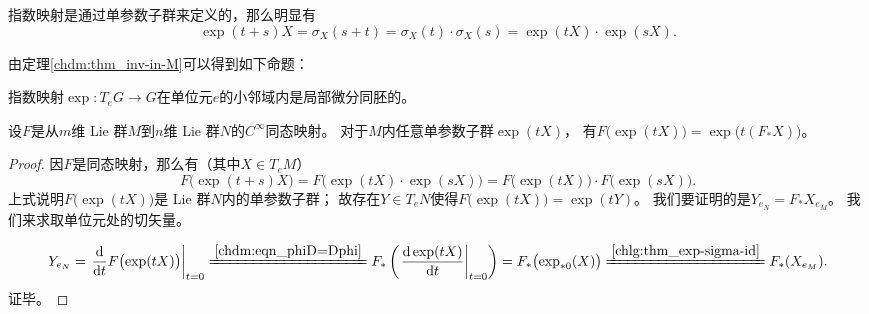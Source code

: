指数映射是通过单参数子群来定义的，那么明显有
\begin{equation}
    \exp(t+s)X = \sigma_X(s+t) = \sigma_X(t)\cdot \sigma_X(s) = \exp(tX) \cdot \exp(sX) .
\end{equation}

由定理\ref{chdm:thm_inv-in-M}可以得到如下命题：
\begin{proposition}\label{chlg:thm_exp-sigma-id-cor1}
    指数映射$\exp : T_e G \to G$在单位元$e$的小邻域内是局部微分同胚的。
\end{proposition}

\begin{theorem}\label{chlg:thm_feef}
    设$F$是从$m$维 Lie 群$M$到$n$维 Lie 群$N$的$C^\infty$同态映射。
    对于$M$内任意单参数子群$\exp (tX)$，
    有$F\bigl(\exp (tX)\bigr) = \exp \bigl(t (F_{*} X)\bigr)$。
\end{theorem}
\begin{proof}
    因$F$是同态映射，那么有（其中$X\in T_eM$）
    \begin{equation*}
        F\bigl(\exp (t+s)X\bigr)=F\bigl(\exp (tX) \cdot \exp (sX) \bigr)
        =F\bigl(\exp (tX) \bigr)\cdot F\bigl( \exp (sX) \bigr) .
    \end{equation*}
    上式说明$F\bigl(\exp (tX)\bigr)$是 Lie 群$N$内的单参数子群；
    故存在$Y\in T_eN$使得$F\bigl(\exp (tX)\bigr)= \exp(tY)$。
    我们要证明的是$Y_{e_N} = F_* X_{e_M}$。
    我们来求取单位元处的切矢量。

    \begin{equation*}
        Y_{e_N}=
        \left.\frac{\d }{\d t}F\bigl(\exp (tX)\bigr)\right|_{t=0}
        \xlongequal{\ref{chdm:eqn_phiD=Dphi}}
        F_{*} \left(\left.\frac{\d \exp (tX)}{\d t}\right|_{t=0} \right)
        =F_{*} \bigl(\exp_{*0}(X) \bigr)
        \xlongequal{\ref{chlg:thm_exp-sigma-id}}F_{*} (X_{e_M}) .
    \end{equation*}
    证毕。
\end{proof}

